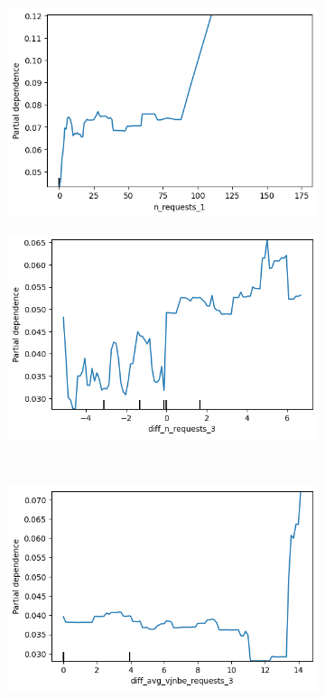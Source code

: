 \documentclass[12pt,titlepage]{article}
\begin{document}
\begin{figure}
\centering
    \begin{subfigure}{.55\textwidth}
      \centering
      \includegraphics[width=1\linewidth]{pdp_n_requests_1.png}
    \end{subfigure}%
    \begin{subfigure}{.55\textwidth}
      \centering
      \includegraphics[width=1\linewidth]{pdp_diff_n_requests_3.png}
    \end{subfigure} \\
    \begin{subfigure}{.55\textwidth}
        \centering
        \includegraphics[width=1\linewidth]{pdp_diff_avg_vjnbe_requests_3.png}

\end{subfigure}
\end{figure}
\end{document}

